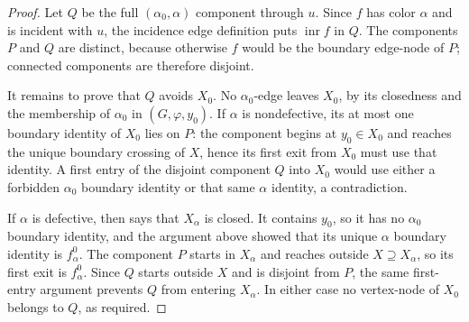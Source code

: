 \begin{proof}
Let $Q$ be the full $(\alpha_0,\alpha)$ component through $u$.  Since
$f$ has color $\alpha$ and is incident with $u$, the incidence edge
definition puts $\operatorname{inr}f$ in $Q$.  The components $P$ and
$Q$ are distinct, because otherwise $f$ would be the boundary edge-node
of $P$; connected components are therefore disjoint.

It remains to prove that $Q$ avoids $X_0$.  No $\alpha_0$-edge leaves
$X_0$, by its closedness and the membership of $\alpha_0$ in
$(G,\varphi,y_0)$.  If
$\alpha$ is nondefective, its at most one boundary identity of $X_0$ lies
on $P$: the component begins at $y_0\in X_0$ and reaches the unique
boundary crossing of $X$, hence its first exit from $X_0$ must use that
identity.  A first entry of the disjoint component $Q$ into $X_0$ would
use either a forbidden $\alpha_0$ boundary identity or that same
$\alpha$ identity, a contradiction.

If $\alpha$ is defective, then
 says that $X_\alpha$ is closed.
It contains $y_0$, so it has no $\alpha_0$ boundary identity, and the
argument above showed that its unique $\alpha$ boundary identity is
$f^0_\alpha$.  The component $P$ starts in $X_\alpha$ and reaches outside
$X\supseteq X_\alpha$, so its first exit is $f^0_\alpha$.  Since $Q$
starts outside $X$ and is disjoint from $P$, the same first-entry argument
prevents $Q$ from entering $X_\alpha$.  In either case no vertex-node of
$X_0$ belongs to $Q$, as required.
\end{proof}
